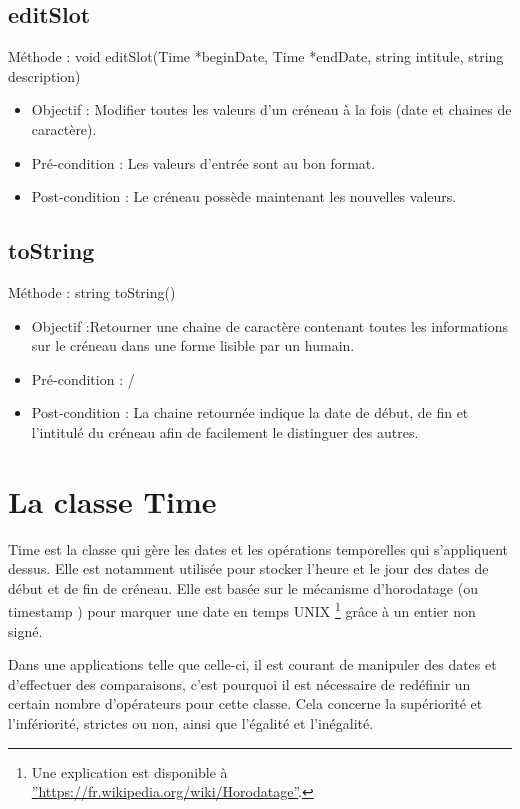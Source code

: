    		\subsection*{editSlot}
            Méthode : void editSlot(Time *beginDate, Time *endDate, string intitule, string description)
			\begin{itemize}
				\item Objectif  : Modifier toutes les valeurs d'un créneau à la fois (date et chaines de caractère).
				\item Pré-condition : Les valeurs d'entrée sont au bon format.
				\item Post-condition : Le créneau possède maintenant les nouvelles valeurs.
			\end{itemize}
			
   		\subsection*{toString}
            Méthode : string toString()
			\begin{itemize}
				\item Objectif  :Retourner une chaine de caractère contenant toutes les informations sur le créneau dans une forme lisible par un humain.
				\item Pré-condition : /
				\item Post-condition : La chaine retournée indique la date de début, de fin et l'intitulé du créneau afin de facilement le distinguer des autres.
			\end{itemize}

	\section{La classe Time}  
        Time est la classe qui gère les dates et les opérations temporelles qui s'appliquent dessus. Elle est notamment utilisée pour stocker l'heure et le jour des dates de début et de fin de créneau. Elle est basée sur le mécanisme d'horodatage (ou \og timestamp \fg{}) pour marquer une date en temps UNIX \footnote{Une explication est disponible à \hyperref[cette adresse]{''https://fr.wikipedia.org/wiki/Horodatage''}.} grâce à un entier non signé.
        
        Dans une applications telle que celle-ci, il est courant de manipuler des dates et d'effectuer des comparaisons, c'est pourquoi il est nécessaire de redéfinir un certain nombre d'opérateurs pour cette classe. Cela concerne la supériorité et l'infériorité, strictes ou non, ainsi que l'égalité et l'inégalité.
        
